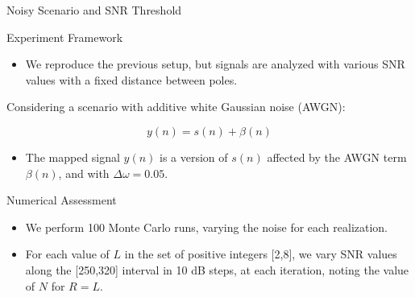 \documentclass{beamer}
\begin{document}
	\begin{frame}{Noisy Scenario and SNR Threshold}

	    \begin{block}{Experiment Framework}
        	\begin{itemize}
        	    \item We reproduce the previous setup, but signals are analyzed with various SNR values with a fixed distance between poles.
        	\end{itemize}
		\end{block}
        
        Considering a scenario with additive white Gaussian noise (AWGN):
        
		\vspace{-10pt}

		$$ y(n) = s(n) + \beta(n) $$
		
		\begin{itemize}
		    \item The mapped signal $y(n)$ is a version of $s(n)$ affected by the AWGN term $\beta(n)$, and with $\Delta \omega = 0.05$. 
		\end{itemize}
		
		\begin{block}{Numerical Assessment}
		    \begin{itemize}
                \item We perform 100 Monte Carlo runs, varying the noise for each realization.
			    \item For each value of $L$ in the set of positive integers [2,8], we vary SNR values along the [250,320] interval in 10 dB steps, at each iteration, noting the value of $N$ for $R = L$.
		    \end{itemize}
		\end{block}
		
	\end{frame}
	
\end{document}
